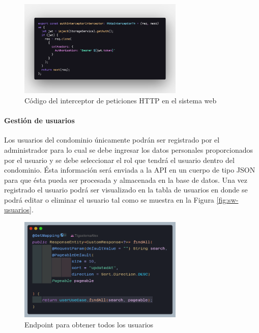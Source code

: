 \begin{figure}[H]
    \centering
    \includegraphics[width=0.7\textwidth]{resources/images/sw-interceptor}
    \caption{Código del interceptor de peticiones HTTP en el sistema web}
    \label{fig:sw-interceptor}
\end{figure}

\paragraph{Gestión de usuarios}

Los usuarios del condominio únicamente podrán ser registrado por el administrador para lo cual se debe ingresar los datos personales proporcionados por el usuario y se debe seleccionar el rol que tendrá el usuario dentro del condominio.
Ésta información será enviada a la API en un cuerpo de tipo JSON para que ésta pueda ser procesada y almacenada en la base de datos.
Una vez registrado el usuario podrá ser visualizado en la tabla de usuarios en donde se podrá editar o eliminar el usuario tal como se muestra en la Figura \ref{fig:sw-usuarios}.

\begin{figure}[H]
    \centering
    \includegraphics[width=0.7\textwidth]{resources/images/api-controller-findall}
    \caption{Endpoint para obtener todos los usuarios}
    \label{fig:api-findAll-controller}
\end{figure}

